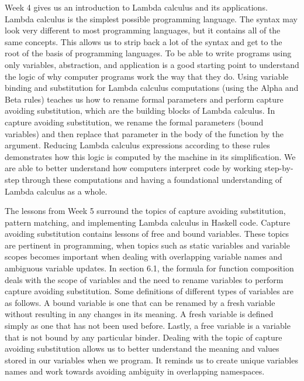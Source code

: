 \documentclass{article}
\theoremstyle{theorem}
\theoremstyle{definition}
\theoremstyle{remark}
\begin{document}
Week 4 gives us an introduction to Lambda calculus and its applications. Lambda calculus is the simplest possible programming language. The syntax may look very different to most programming languages, but it contains all of the same concepts. This allows us to strip back a lot of the syntax and get to the root of the basis of programming languages. To be able to write programs using only variables, abstraction, and application is a good starting point to understand the logic of why computer programs work the way that they do. Using variable binding and substitution for Lambda calculus computations (using the Alpha and Beta rules) teaches us how to rename formal parameters and perform capture avoiding substitution, which are the building blocks of Lambda calculus. In capture avoiding substitution, we rename the formal parameters (bound variables) and then replace that parameter in the body of the function by the argument. Reducing Lambda calculus expressions according to these rules demonstrates how this logic is computed by the machine in its simplification. We are able to better understand how computers interpret code by working step-by-step through these computations and having a foundational understanding of Lambda calculus as a whole. 

The lessons from Week 5 surround the topics of capture avoiding substitution, pattern matching, and implementing Lambda calculus in Haskell code. Capture avoiding substitution contains lessons of free and bound variables. These topics are pertinent in programming, when topics such as static variables and variable scopes becomes important when dealing with overlapping variable names and ambiguous variable updates. In section 6.1, the formula for function composition deals with the scope of variables and the need to rename variables to perform capture avoiding substitution. Some definitions of different types of variables are as follows. A bound variable is one that can be renamed by a fresh variable without resulting in any changes in its meaning. A fresh variable is defined simply as one that has not been used before. Lastly, a free variable is a variable that is not bound by any particular binder. Dealing with the topic of capture avoiding substitution allows us to better understand the meaning and values stored in our variables when we program. It reminds us to create unique variables names and work towards avoiding ambiguity in overlapping namespaces. 
\end{document}
